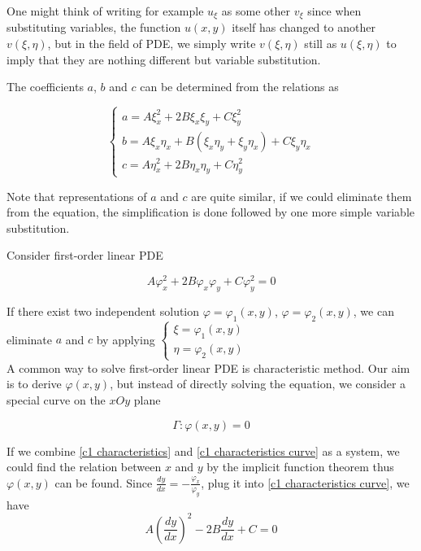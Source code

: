 	One might think of writing for example $u_{\xi}$ as some other $v_{\xi}$ since when substituting variables, the function $u(x, y)$ itself has changed to another $v(\xi, \eta)$, but in the field of PDE, we simply write $v(\xi, \eta)$ still as $u(\xi, \eta)$ to imply that they are nothing different but variable substitution.
	
	The coefficients $a$, $b$ and $c$ can be determined from the relations as
	
	$$\begin{cases}
		a = A\xi_x^2 + 2B\xi_{x}\xi_y + C\xi_y^2\\
		b = A\xi_x\eta_x + B(\xi_x\eta_y + \xi_y\eta_x) + C\xi_y\eta_x\\
		c = A\eta_x^2 + 2B\eta_x\eta_y + C\eta_y^2
	\end{cases}$$
	
	 Note that representations of $a$ and $c$ are quite similar, if we could eliminate them from the equation, the simplification is done followed by one more simple variable substitution. 
	 
	 Consider first-order linear PDE 
	 
	 \begin{equation}
	 	A\varphi_x^2 + 2B\varphi_x\varphi_y + C\varphi_y^2 = 0
	 	\label{c1 characteristics}
	 \end{equation}
	 
	 If there exist two independent solution $\varphi = \varphi_1(x, y)$, $\varphi = \varphi_2(x, y)$, we can eliminate $a$ and $c$ by applying
	 $\begin{cases}
	 	\xi = \varphi_1(x, y)\\
	 	\eta = \varphi_2(x, y)
	 \end{cases}$\\
	
	A common way to solve first-order linear PDE is characteristic method. Our aim is to derive $\varphi(x, y)$, but instead of directly solving the equation, we consider a special curve on the $xOy$ plane 
	
	\begin{equation}
		\Gamma : \varphi(x, y) = 0
		\label{c1 characteristics curve}
	\end{equation}
	
	If we combine \eqref{c1 characteristics} and \eqref{c1 characteristics curve} as a system, we could find the relation between $x$ and $y$ by the implicit function theorem thus $\varphi(x, y)$ can be found. Since $\frac{dy}{dx} = -\frac{\varphi_x}{\varphi_y}$, plug it into \eqref{c1 characteristics curve}, we have 
	\begin{equation}
		A(\frac{dy}{dx})^2 - 2B\frac{dy}{dx} + C = 0
		\label{characteristics temp1}
	\end{equation}
	
